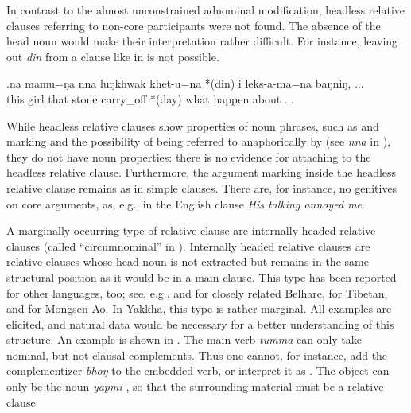 In contrast to the almost unconstrained adnominal modification, headless relative clauses referring to non-core participants were not found. The absence of the head noun would make their interpretation rather difficult. For instance, leaving out \emph{din}  from a clause like in \Next is not possible. 

\exg.na   mamu=ŋa   nna  luŋkhwak khet-u=na  *(din) i leks-a-ma=na  baŋniŋ, ...\\
this girl that stone  carry\_off *(day) what happen about ...\\
 


While headless relative clauses show  properties of noun phrases, such as  and  marking and the possibility of being referred to anaphorically by  (see \emph{nna} in \LLast[a]), they do not have noun properties: there is  no evidence for  attaching to the headless relative clause. Furthermore, the argument marking inside the headless relative clause remains as in simple clauses. There are, for instance, no genitives on core arguments, as, e.g., in the English clause \emph{His talking annoyed me}. 

A marginally occurring type of relative clause are internally headed relative clauses (called “circumnominal” in \citealt{Lehmann1984Der-Relativsatz}). Internally headed relative clauses are relative clauses whose head noun is not extracted but remains in the same structural position as it would be in a main clause. This type has been reported for other  languages, too; see, e.g., \citet[3]{Bickel2005On-the-typological} and \cite{Bickel1999Nominalization} for closely related Belhare, \citet[245]{DeLancey1999Relativization} for Tibetan, and \citet[255]{Coupe2007_Mongsen} for Mongsen Ao. In Yakkha, this type is rather marginal. All examples are elicited, and natural data would be necessary for a better understanding of this structure. An example is shown in \Next. The main verb \emph{tumma}  can only take nominal, but not clausal complements. Thus one cannot, for instance, add the complementizer \emph{bhoŋ} to the embedded verb, or interpret it as . The object can only be the noun \emph{yapmi} , so that the surrounding material must be a relative clause.


